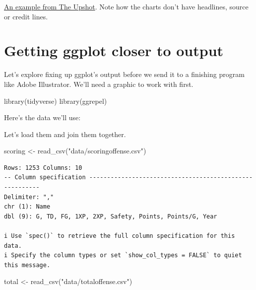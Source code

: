 \documentclass[
  letterpaper,
  DIV=11,
  numbers=noendperiod]{scrreprt}
\newenvironment{Shaded}{\begin{snugshade}}{\end{snugshade}}
\newcommand{\FunctionTok}[1]{\textcolor[rgb]{0.28,0.35,0.67}{#1}}
\newcommand{\NormalTok}[1]{\textcolor[rgb]{0.00,0.23,0.31}{#1}}
\newcommand{\OtherTok}[1]{\textcolor[rgb]{0.00,0.23,0.31}{#1}}
\newcommand{\StringTok}[1]{\textcolor[rgb]{0.13,0.47,0.30}{#1}}
\begin{document}
\href{https://www.nytimes.com/interactive/2018/02/14/business/economy/inflation-prices.html}{An
example from The Upshot}. Note how the charts don't have headlines,
source or credit lines.

\hypertarget{getting-ggplot-closer-to-output}{%
\section{Getting ggplot closer to
output}\label{getting-ggplot-closer-to-output}}

Let's explore fixing up ggplot's output before we send it to a finishing
program like Adobe Illustrator. We'll need a graphic to work with first.

\begin{Shaded}
\begin{Highlighting}[]
\FunctionTok{library}\NormalTok{(tidyverse)}
\FunctionTok{library}\NormalTok{(ggrepel)}
\end{Highlighting}
\end{Shaded}

Here's the data we'll use:

Let's load them and join them together.

\begin{Shaded}
\begin{Highlighting}[]
\NormalTok{scoring }\OtherTok{\textless{}{-}} \FunctionTok{read\_csv}\NormalTok{(}\StringTok{"data/scoringoffense.csv"}\NormalTok{)}
\end{Highlighting}
\end{Shaded}

\begin{verbatim}
Rows: 1253 Columns: 10
-- Column specification --------------------------------------------------------
Delimiter: ","
chr (1): Name
dbl (9): G, TD, FG, 1XP, 2XP, Safety, Points, Points/G, Year

i Use `spec()` to retrieve the full column specification for this data.
i Specify the column types or set `show_col_types = FALSE` to quiet this message.
\end{verbatim}

\begin{Shaded}
\begin{Highlighting}[]
\NormalTok{total }\OtherTok{\textless{}{-}} \FunctionTok{read\_csv}\NormalTok{(}\StringTok{"data/totaloffense.csv"}\NormalTok{)}
\end{Highlighting}
\end{Shaded}
\end{document}
